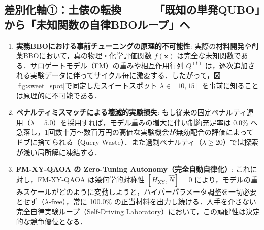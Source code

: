 \documentclass[11pt,a4paper]{ltjsarticle}
\begin{document}
\subsection{差別化軸①：土俵の転換 —— 「既知の単発QUBO」から「未知関数の自律BBOループ」へ}
\begin{enumerate}\setlength{\itemsep}{0.8pt}
    \item \textbf{実務BBOにおける事前チューニングの原理的不可能性}:
    実際の材料開発や創薬BBOにおいて，真の物理・化学評価関数 $f(\bm{x})$ は完全な未知関数である．サロゲートモデル（FM）の重みや相互作用行列 $Q^{(t)}$ は，逐次追加される実験データに伴ってサイクル毎に激変する．したがって，図\ref{fig:sweet_spot}で同定したスイートスポット $\lambda \in [10, 15]$ を事前に知ることは原理的に不可能である．
    \item \textbf{ペナルティミスマッチによる壊滅的実験損失}:
    もし従来の固定ペナルティ運用（$\lambda=5.0$）を採用すれば，モデル重みの増大に伴い制約充足率は $0.0\%$ へ急落し，1回数十万〜数百万円の高価な実験機会が無効配合の評価によってドブに捨てられる（Query Waste）．また過剰ペナルティ（$\lambda \ge 20$）では探索が浅い局所解に凍結する．
    \item \textbf{FM-XY-QAOA の Zero-Tuning Autonomy（完全自動自律化）}:
    これに対し，FM-XY-QAOA は幾何学的対称性 $[H_{\mathrm{XY}}, \hat{N}]=0$ により，モデルの重みスケールがどのように変動しようと，ハイパーパラメータ調整を一切必要とせず（$\lambda$-free），常に 100.0\% の正当材料を出力し続ける．人手を介さない完全自律実験ループ（Self-Driving Laboratory）において，この頑健性は決定的な競争優位となる．
\end{enumerate}
\end{document}
